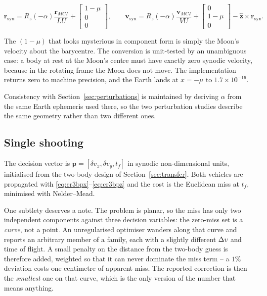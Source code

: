 \begin{equation}
\mathbf r_{\text{syn}} = R_z(-\alpha)\frac{\mathbf r_{MCI}}{LU} + \begin{bmatrix}1-\mu\\0\\0\end{bmatrix},
\qquad
\mathbf v_{\text{syn}} = R_z(-\alpha)\frac{\mathbf v_{MCI}}{VU} + \begin{bmatrix}0\\1-\mu\\0\end{bmatrix}
                        - \hat{\mathbf z}\times\mathbf r_{\text{syn}} .
\label{eq:syn}
\end{equation}

The $(1-\mu)$ that looks mysterious in component form is simply the Moon's
velocity about the barycentre. The conversion is unit-tested by an
unambiguous case: a body at rest at the Moon's centre must have exactly zero
synodic velocity, because in the rotating frame the Moon does not move. The
implementation returns zero to machine precision, and the Earth lands at
$x = -\mu$ to $1.7\times10^{-16}$.

Consistency with Section~\ref{sec:perturbations} is maintained by deriving
$\alpha$ from the same Earth ephemeris used there, so the two perturbation
studies describe the same geometry rather than two different ones.

\subsection{Single shooting}

The decision vector is $\mathbf p = [\delta v_x, \delta v_y, t_f]$ in synodic
non-dimensional units, initialised from the two-body design of
Section~\ref{sec:transfer}. Both vehicles are propagated with
\eqref{eq:cr3bpx}--\eqref{eq:cr3bpz} and the cost is the Euclidean miss at $t_f$,
minimised with Nelder--Mead.

One subtlety deserves a note. The problem is planar, so the miss has only two
independent components against three decision variables: the zero-miss set is a
\emph{curve}, not a point. An unregularised optimiser wanders along that curve
and reports an arbitrary member of a family, each with a slightly different
$\Delta v$ and time of flight. A small penalty on the distance from the two-body
guess is therefore added, weighted so that it can never dominate the miss term
-- a $1\%$ deviation costs one centimetre of apparent miss. The reported
correction is then the \emph{smallest} one on that curve, which is the only
version of the number that means anything.

